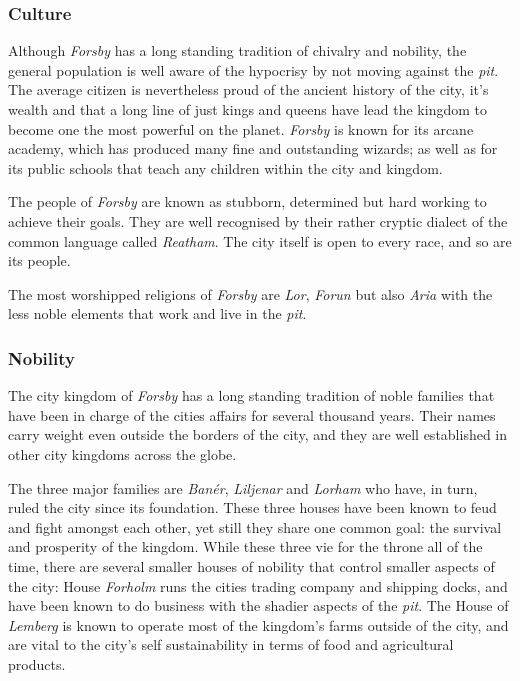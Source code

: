 \subsubsection*{Culture}

Although \emph{Forsby} has a long standing tradition of chivalry and nobility,
the general population is well aware of the hypocrisy by not moving against the
\emph{pit}. The average citizen is nevertheless proud of the ancient history of
the city, it's wealth and that a long line of just kings and queens have lead
the kingdom to become one the most powerful on the planet. \emph{Forsby} is
known for its arcane academy, which has produced many fine and outstanding
wizards; as well as for its public schools that teach any children within the
city and kingdom.

The people of \emph{Forsby} are known as stubborn, determined but hard working
to achieve their goals. They are well recognised by their rather cryptic dialect
of the common language called \emph{Reatham}. The city itself is open to every
race, and so are its people.

The most worshipped religions of \emph{Forsby} are \emph{Lor}, \emph{Forun}
but also \emph{Aria} with the less noble elements that work and live in the
\emph{pit}.

\subsubsection*{Nobility}

The city kingdom of \emph{Forsby} has a long standing tradition of noble
families that have been in charge of the cities affairs for several thousand
years. Their names carry weight even outside the borders of the city, and
they are well established in other city kingdoms across the globe.

The three major families are \emph{Banér}, \emph{Liljenar} and \emph{Lorham}
who have, in turn, ruled the city since its foundation. These three houses
have been known to feud and fight amongst each other, yet still they share
one common goal: the survival and prosperity of the kingdom. While these
three vie for the throne all of the time, there are several smaller houses
of nobility that control smaller aspects of the city: House \emph{Forholm}
runs the cities trading company and shipping docks, and have been known to
do business with the shadier aspects of the \emph{pit}. The House of
\emph{Lemberg} is known to operate most of the kingdom's farms outside of
the city, and are vital to the city's self sustainability in terms of food
and agricultural products.
